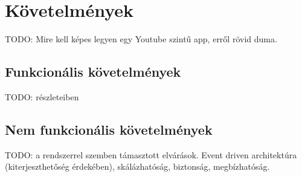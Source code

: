 \chapter{Követelmények}

TODO: Mire kell képes legyen egy Youtube szintű app, erről rövid duma.



\section{Funkcionális követelmények}

TODO: részleteiben

\section{Nem funkcionális követelmények}

TODO: a rendszerrel szemben támasztott elvárások. Event driven architektúra (kiterjeszthetőség érdekében), skálázhatóság, biztonság, megbízhatóság.
